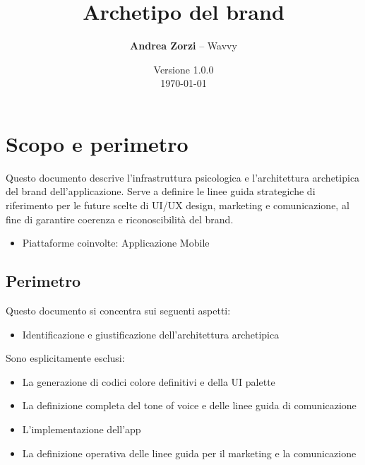 \documentclass[a4paper, 11pt, table, dvipsnames]{article}
\title{\textbf{Archetipo del brand}}
\author{\textbf{Andrea Zorzi} -- Wavvy}
\date{Versione 1.0.0 \\ \today}
\begin{document}
\maketitle

\tableofcontents

\newpage


\section{Scopo e perimetro}

Questo documento descrive l'infrastruttura psicologica e l'architettura
archetipica del brand dell'applicazione. Serve a definire le linee
guida strategiche di riferimento per le future scelte di UI/UX design,
marketing e comunicazione, al fine di garantire coerenza e
riconoscibilità del brand.

\begin{itemize}
      \item Piattaforme coinvolte: Applicazione Mobile
\end{itemize}

\subsection{Perimetro}
Questo documento si concentra sui seguenti aspetti:
\begin{itemize}
      \item Identificazione e giustificazione dell'architettura
            archetipica
\end{itemize}

Sono esplicitamente esclusi:
\begin{itemize}
      \item La generazione di codici colore definitivi e della UI palette

      \item La definizione completa del tone of voice e delle linee guida di comunicazione

      \item L'implementazione dell'app

      \item La definizione operativa delle linee guida per il marketing e la comunicazione
\end{itemize}
\end{document}
